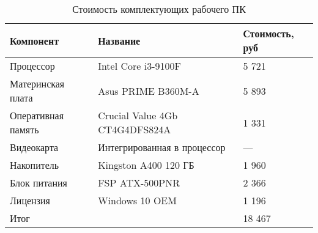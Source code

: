 \begin{table}[t]
    \centering
    \caption{Стоимость комплектующих рабочего ПК}
    \label{tab:pc_price}
    \begin{tabu}to \linewidth{X[m]X[2.2,c,m]X[r,m]}
        \toprule
        Компонент & Название & Стоимость, руб \\
        \midrule
        Процессор          & Intel Core i3-9100F            & 5 721 \\
        Материнская плата  & Asus PRIME B360M-A             & 5 893 \\
        Оперативная память & Crucial Value 4Gb CT4G4DFS824A & 1 331 \\
        Видеокарта         & Интегрированная в процессор    & —     \\
        Накопитель         & Kingston A400 120 ГБ           & 1 960 \\
        Блок питания       & FSP ATX-500PNR                 & 2 366 \\
        Лицензия           & Windows 10 OEM                 & 1 196 \\
        \midrule
        Итог & & 18 467 \\
        \bottomrule
    \end{tabu}
\end{table}

